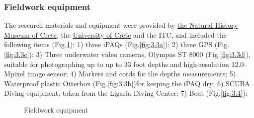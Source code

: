 \documentclass[11pt]{article}
\begin{document}
\subsubsection{Fieldwork equipment}
The research materials and equipment were provided by \href{http://147.52.130.151/MFIK_en/}{the Natural History Museum of Crete}, the \href{http://www.uoc.gr/Department/index.html}{University of Crete} and the ITC, and included the following items (Fig.\ref{fig:3.3}): 1) three iPAQs (Fig.\ref{fig:3.3a}); 2)
three GPS (Fig.\ref{fig:3.3c}); 3) Three underwater video cameras, \ac{Olympus ST} 8000  (Fig.\ref{fig:3.3d}), suitable for
photographing up to up to 33 foot depths and high-resolution 12.0-Mpixel image sensor; 4)
Markers and cords for the depths measurements; 5) Waterproof plastic Otterbox  (Fig.\ref{fig:3.3b})for keeping the
iPAQ dry; 6) \ac{SCUBA} Diving equipment, taken from the Ligaria Diving Center; 7) Boat (Fig.\ref{fig:3.4}); 

\begin{figure}[H]
	\centering
	\caption{Fieldwork equipment}
	\label{fig:3.3}
\end{figure}
\end{document}
